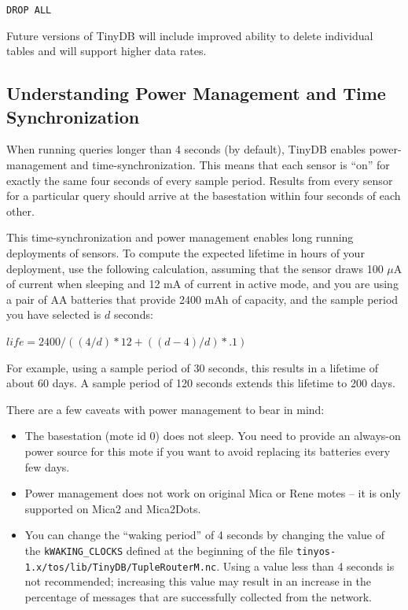\documentclass[11pt]{article}
\renewcommand{\baselinestretch}{1.2}
\newcommand{\sqlquery}[1]{
{\renewcommand\baselinestretch{.8}\rm
\begin{samepage}
\setlength{\parskip}{.1\baselineskip} 
\small
\hspace{.3in}\parbox[t]{5in}{\setlength{\parindent}{-.1in}\tt{#1}\\}
\normalsize
\renewcommand\baselinestretch{1.0}\rm
\end{samepage}
}}
\newcommand{\docroot}{tinyos-1.x}
\begin{document}
\sqlquery{DROP ALL}

Future versions of TinyDB will include improved ability to delete individual tables and
will support higher data rates.

\subsection{Understanding Power Management and Time Synchronization}\label{sec:time-sync}

When running queries longer than 4 seconds (by default), TinyDB
enables power-management and time-synchronization.  This means that
each sensor is ``on'' for exactly the same four seconds of every
sample period.  Results from every sensor for a particular query
should arrive at the basestation within four seconds of each other.

This time-synchronization and power management enables long running
deployments of sensors.  To compute the expected lifetime in hours of
your deployment, use the following calculation, assuming that the
sensor draws 100 $\mu$A of current when sleeping and 12 mA of
current in active mode, and you are using a pair of AA batteries that
provide 2400 mAh of capacity, and the sample period you have selected
is $d$ seconds:

$life = 2400/((4/d) * 12 + ((d-4)/d) * .1)$

\noindent For example, using a sample period of 30 seconds, this results in a lifetime
of about 60 days.  A sample period of 120 seconds extends this
lifetime to 200 days.

There are a few caveats with power management to bear in mind:
\begin{itemize}
\item The basestation (mote id 0) does not sleep.  You need to provide
  an always-on power source for this mote if you want to avoid
  replacing its batteries every few days.
\item Power management does not work on original Mica or Rene motes --
  it is only supported on Mica2 and Mica2Dots.
\item You can change the ``waking period'' of 4 seconds by changing the value
  of the {\tt kWAKING\_CLOCKS} defined at the beginning of the file 
  {\tt \docroot/tos/lib/TinyDB/TupleRouterM.nc}.  Using a value less than 4 seconds
  is not recommended;  increasing this value may result in an increase in the
  percentage of messages that are successfully collected from the network.
\end{itemize}
\end{document}
